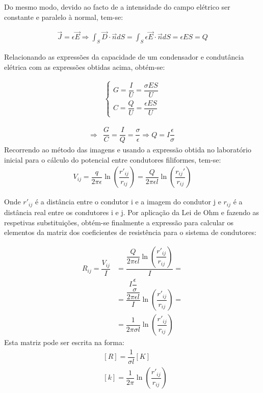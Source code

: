 \documentclass[portuguese, a4paper, fleqn]{article}
\begin{document}
	Do mesmo modo, devido ao facto de a intensidade do campo elétrico ser constante e paralelo à normal, tem-se:

	\begin{align*}
		\vec{J} = \epsilon \vec{E} \Rightarrow \int _ { S } \vec{D} \cdot \vec{n} d S = \int _ { S } \epsilon \vec{E} \cdot \vec{n} d S = \epsilon E S = Q
	\end{align*}

	Relacionando as expressões da capacidade de um condensador e condutância elétrica com as expressões obtidas acima, obtém-se:

	\begin{align*}
		\begin{cases}
			G = \dfrac{I}{U} = \dfrac{\sigma E S}{U} \\[1em]
    	C = \dfrac{Q}{U} = \dfrac{\epsilon E S}{U}
 		\end{cases}
	\end{align*}

	\begin{align*}
		\Rightarrow &\dfrac{G}{C} = \dfrac{I}{Q} = \dfrac{\sigma}{\epsilon} \Rightarrow Q = I\dfrac{\epsilon}{\sigma}
	\end{align*}
	Recorrendo ao método das imagens e usando a expressão obtida no laboratório inicial para o cálculo do potencial entre condutores filiformes, tem-se:
	\begin{align*}
		V_{ij} = \dfrac{q}{2\pi\epsilon} \ln\left(\dfrac{r'_{ij} }{r_{ij} }\right) = \dfrac{Q}{2\pi\epsilon l} \ln\left(\dfrac{r_{ij} '}{r_{ij} }\right)
	\end{align*}

	Onde $r'_{ij}$ é a distância entre o condutor i e a imagem do condutor j e $r_{ij}$ é a distância real entre os condutores i e j. Por aplicação da Lei de Ohm e fazendo as respetivas substituições, obtém-se finalmente a expressão para calcular os elementos da matriz dos coeficientes de resistência para o sistema de condutores:

	\begin{align*}
		R_{ij} = \dfrac{V_{ij} }{I} &= \dfrac{\dfrac{Q}{2\pi\epsilon l} \ln\left(\dfrac{r'_{ij} }{r_{ij} }\right)}{I} = \\
		&= \dfrac{\dfrac{I\dfrac{\epsilon}{\sigma}}{2\pi\epsilon l}}{I} \ln\left(\dfrac{r'_{ij} }{r_{ij} }\right) = \\
		&= \dfrac{1}{2\pi\sigma l}\ln\left(\dfrac{r'_{ij} }{r_{ij} }\right)
	\end{align*}
	Esta matriz pode ser escrita na forma:
	\begin{align*}
		&[R] = \dfrac{1}{\sigma l} [K] \\
		&[k] = \dfrac{1}{2 \pi} \ln\left(\dfrac{r'_{ij} }{r_{ij} }\right)
	\end{align*}
\end{document}
